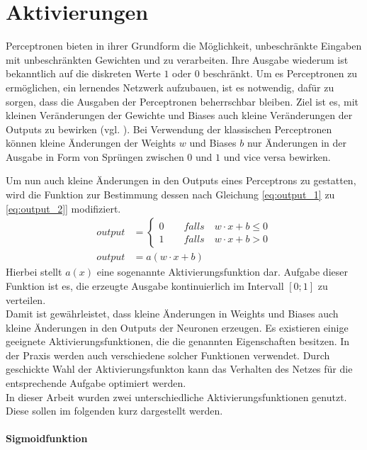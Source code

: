 \documentclass[../main.tex]{subfiles}
\begin{document}
\section{Aktivierungen}
Perceptronen bieten in ihrer Grundform die Möglichkeit, unbeschränkte Eingaben mit unbeschränkten Gewichten und zu verarbeiten. Ihre Ausgabe wiederum ist bekanntlich auf die diskreten Werte $1$ oder $0$ beschränkt. Um es Perceptronen zu ermöglichen, ein lernendes Netzwerk aufzubauen, ist es notwendig, dafür zu sorgen, dass die Ausgaben der Perceptronen beherrschbar bleiben. Ziel ist es, mit kleinen Veränderungen der Gewichte und Biases auch kleine Veränderungen der Outputs zu bewirken (vgl. \cite{NNADL_PIC_CONV_1}). Bei Verwendung der klassischen Perceptronen können kleine Änderungen der Weights $w$ und Biases $b$ nur Änderungen in der Ausgabe in Form von Sprüngen zwischen $0$ und $1$ und vice versa bewirken. \par
Um nun auch kleine Änderungen in den Outputs eines Perceptrons zu gestatten, wird die Funktion zur Bestimmung dessen nach Gleichung \ref{eq:output_1} zu \ref{eq:output_2}] modifiziert. 
\begin{align}\label{eq:output_1}
	output &= \left \{ \begin{matrix}
	0 \qquad falls \quad w \cdot x + b \leq 0 \\ 1 \qquad falls \quad w\cdot x + b > 0
	\end{matrix} \right . \\\label{eq:output_2}
	output &= a(w\cdot x + b) 
\end{align}
Hierbei stellt $a(x)$ eine sogenannte Aktivierungsfunktion dar. Aufgabe dieser Funktion ist es, die erzeugte Ausgabe kontinuierlich im Intervall $[0;1]$ zu verteilen. \\ Damit ist gewährleistet, dass kleine Änderungen in Weights und Biases auch kleine Änderungen in den Outputs der Neuronen erzeugen. Es existieren einige geeignete Aktivierungsfunktionen, die die genannten Eigenschaften besitzen. In der Praxis werden auch verschiedene solcher Funktionen verwendet. Durch geschickte Wahl der Aktivierungsfunkton kann das Verhalten des Netzes für die entsprechende Aufgabe optimiert werden.\\ In dieser Arbeit wurden zwei unterschiedliche Aktivierungsfunktionen genutzt. Diese sollen im folgenden kurz dargestellt werden. \paragraph{Sigmoidfunktion} 
\end{document}
